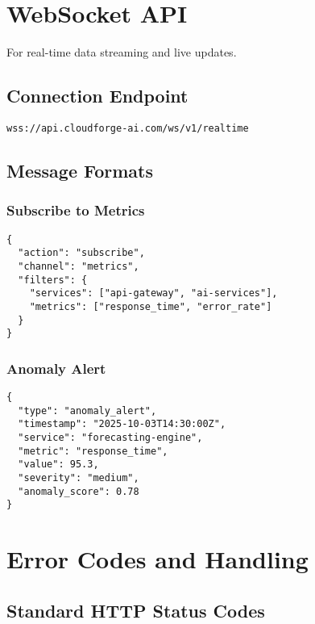 \section{WebSocket API}

For real-time data streaming and live updates.

\subsection{Connection Endpoint}

\begin{verbatim}
wss://api.cloudforge-ai.com/ws/v1/realtime
\end{verbatim}

\subsection{Message Formats}

\subsubsection{Subscribe to Metrics}
\begin{verbatim}
{
  "action": "subscribe",
  "channel": "metrics",
  "filters": {
    "services": ["api-gateway", "ai-services"],
    "metrics": ["response_time", "error_rate"]
  }
}
\end{verbatim}

\subsubsection{Anomaly Alert}
\begin{verbatim}
{
  "type": "anomaly_alert",
  "timestamp": "2025-10-03T14:30:00Z",
  "service": "forecasting-engine",
  "metric": "response_time",
  "value": 95.3,
  "severity": "medium",
  "anomaly_score": 0.78
}
\end{verbatim}

\section{Error Codes and Handling}

\subsection{Standard HTTP Status Codes}

